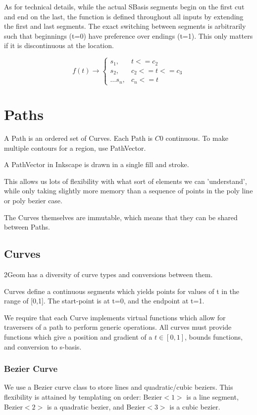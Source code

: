 \documentclass[openany]{book}
\newcommand{\code}[1]{\textsf{#1}}
\begin{document}
As for technical details, while the actual SBasis segments begin on the
first cut and end on the last, the function is defined throughout all
inputs by extending the first and last segments.  The exact switching
between segments is arbitrarily such that beginnings (t=0) have
preference over endings (t=1).  This only matters if it is discontinuous
at the location.

$$
f(t) \rightarrow \left\{ 
\begin{array}{cc}
s_1,& t <= c_2 \\
s_2,& c_2 <= t <= c_3\\
\ldots
s_n,& c_n <= t
\end{array}\right.
$$

\chapter{Paths}

A \code{Path} is an ordered set of \code{Curve}s.  Each \code{Path} is $C0$ continuous.  To make multiple contours for a region, use \code{PathVector}. 

A \code{PathVector} in Inkscape is drawn in a single fill and stroke.  

This allows us lots of flexibility with what sort of elements we can
'understand', while only taking slightly more memory than a sequence
of points in the poly line or poly bezier case. 

The Curves themselves are immutable, which means that they can be shared between Paths.

\section{Curves}
2Geom has a diversity of curve types and conversions between them.

Curves define a continuous segments which yields points for values of
t in the range of [0,1].  The start-point is at t=0, and the endpoint
at t=1.

We require that each \code{Curve} implements virtual functions which
allow for traversers of a path to perform generic operations.  All
curves must provide functions which give a position and gradient of a
$t \in [0,1]$, bounds functions, and conversion to s-basis.

\subsection{Bezier Curve}
We use a \code{Bezier} curve class to store lines and quadratic/cubic
beziers.  This flexibility is attained by templating on order:
\code{Bezier$<1>$} is a line segment, \code{Bezier$<2>$} is a quadratic
bezier, and \code{Bezier$<3>$} is a cubic bezier.
\end{document}
